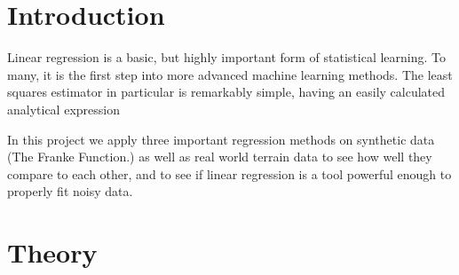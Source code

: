 \documentclass[a4paper, 10pt]{article}
\begin{document}
\begin{multicols}{2}
\section{Introduction}

Linear regression is a basic, but highly important form of statistical learning. To many, it is the first step into more advanced machine learning methods. The least squares estimator in particular is remarkably simple, having an easily calculated analytical expression

 In this project we apply three important regression methods on synthetic data (The Franke Function.) as well as real world terrain data to see how well they compare to each other, and to see if linear regression is a tool powerful enough to properly fit noisy data.


\section{Theory}

\end{multicols}
\end{document}
